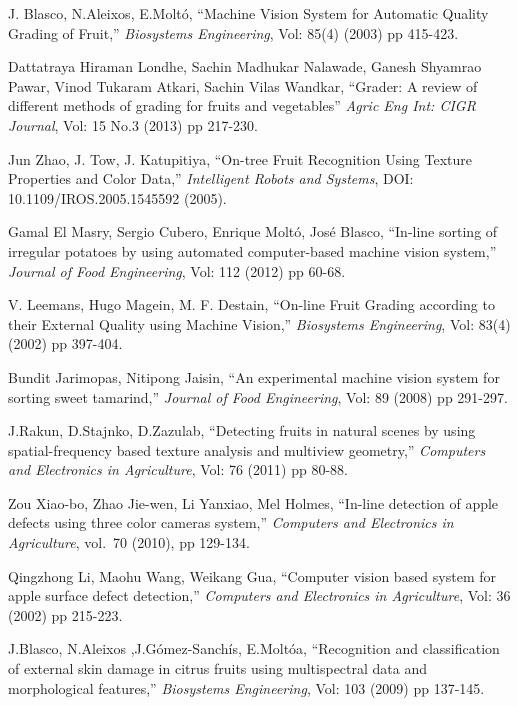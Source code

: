 \documentclass[conference]{IEEEtran}
\begin{document}
\begin{thebibliography}{1}
	
	J. Blasco, N.Aleixos, E.Moltó, ``Machine Vision System for Automatic Quality Grading of Fruit,'' {\em Biosystems Engineering}, Vol: 85(4) (2003) pp 415-423.
	
	Dattatraya Hiraman Londhe, Sachin Madhukar Nalawade, Ganesh Shyamrao Pawar, Vinod Tukaram Atkari, Sachin Vilas Wandkar, ``Grader: A review of different methods of grading for fruits and vegetables'' {\em Agric Eng Int: CIGR Journal}, Vol: 15 No.3 (2013) pp 217-230.
	
	Jun Zhao, J. Tow, J. Katupitiya, ``On-tree Fruit Recognition
	Using Texture Properties and Color Data,'' {\em Intelligent Robots and Systems}, DOI: 10.1109/IROS.2005.1545592 (2005).
	
	Gamal El Masry,  Sergio Cubero,  Enrique Moltó,  José Blasco, ``In-line sorting of irregular potatoes by using automated computer-based machine vision system,'' {\em Journal of Food Engineering}, Vol: 112 (2012) pp 60-68.

	V. Leemans, Hugo Magein, M. F. Destain, ``On-line Fruit Grading according to their External Quality using Machine Vision,'' {\em Biosystems Engineering}, Vol: 83(4) (2002) pp 397-404.
	
	Bundit Jarimopas, Nitipong Jaisin, ``An experimental machine vision system for sorting sweet tamarind,'' {\em Journal of Food Engineering}, Vol: 89 (2008) pp  291-297.
	
	J.Rakun, D.Stajnko, D.Zazulab, ``Detecting fruits in natural scenes by using spatial-frequency based texture analysis and multiview geometry,'' {\em Computers and Electronics in Agriculture}, Vol: 76 (2011) pp 80-88.
	
	Zou Xiao-bo, Zhao Jie-wen, Li Yanxiao, Mel Holmes, ``In-line detection of apple defects using three color cameras system,'' {\em Computers and Electronics in Agriculture}, vol.~70 (2010), pp 129-134.
	
	Qingzhong Li, Maohu Wang, Weikang Gua, ``Computer vision based system for apple surface defect detection,'' {\em Computers and Electronics in Agriculture}, Vol: 36 (2002) pp 215-223.
	
	J.Blasco, N.Aleixos ,J.Gómez-Sanchís, E.Moltóa, ``Recognition and classification of external skin damage in citrus fruits using multispectral data and morphological features,'' {\em Biosystems Engineering}, Vol: 103 (2009) pp 137-145.
	

\end{thebibliography}
\end{document}
